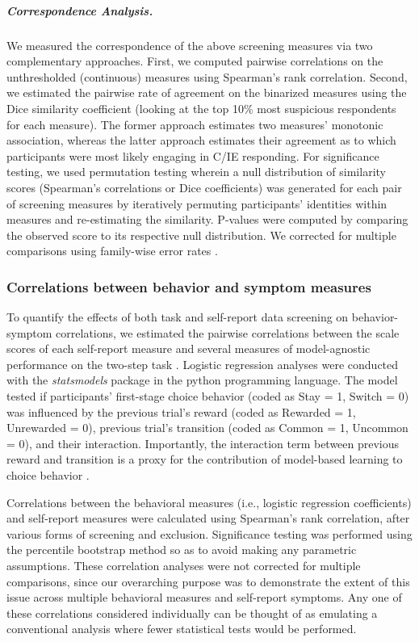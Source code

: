 \documentclass[a4paper,notitlepage,12pt]{article}
\begin{document}
\subparagraph{Correspondence Analysis.} We measured the correspondence of the above screening measures via two complementary approaches. First, we computed pairwise correlations on the unthresholded (continuous) measures using Spearman's rank correlation. Second, we estimated the pairwise rate of agreement on the binarized measures using the Dice similarity coefficient (looking at the top 10\% most suspicious respondents for each measure). The former approach estimates two measures' monotonic association, whereas the latter approach estimates their agreement as to which participants were most likely engaging in C/IE responding. For significance testing, we used permutation testing wherein a null distribution of similarity scores (Spearman's correlations or Dice coefficients) was generated for each pair of screening measures by iteratively permuting participants' identities within measures and re-estimating the similarity. P-values were computed by comparing the observed score to its respective null distribution. We corrected for multiple comparisons using family-wise error rates \cite{winkler2014permutation-2}.

\subsubsection*{Correlations between behavior and symptom measures}

To quantify the effects of both task and self-report data screening on behavior-symptom correlations, we estimated the pairwise correlations between the scale scores of each self-report measure and several measures of model-agnostic performance on the two-step task \cite{gillan2016characterizing}. Logistic regression analyses were conducted with the \textit{statsmodels} package \cite{seabold2010statsmodels} in the python programming language. The model tested if participants' first-stage choice behavior (coded as Stay = 1, Switch = 0) was influenced by the previous trial's reward (coded as Rewarded = 1, Unrewarded = 0), previous trial's transition (coded as Common = 1, Uncommon = 0), and their interaction. Importantly, the interaction term between previous reward and transition is a proxy for the contribution of model-based learning to choice behavior \cite{gillan2016characterizing}.

Correlations between the behavioral measures (i.e., logistic regression coefficients) and self-report measures were calculated using Spearman's rank correlation, after various forms of screening and exclusion. Significance testing was performed using the percentile bootstrap method \cite{wilcox2018guide-2} so as to avoid making any parametric assumptions. These correlation analyses were not corrected for multiple comparisons, since our overarching purpose was to demonstrate the extent of this issue across multiple behavioral measures and self-report symptoms. Any one of these correlations considered individually can be thought of as emulating a conventional analysis where fewer statistical tests would be performed.
\end{document}
